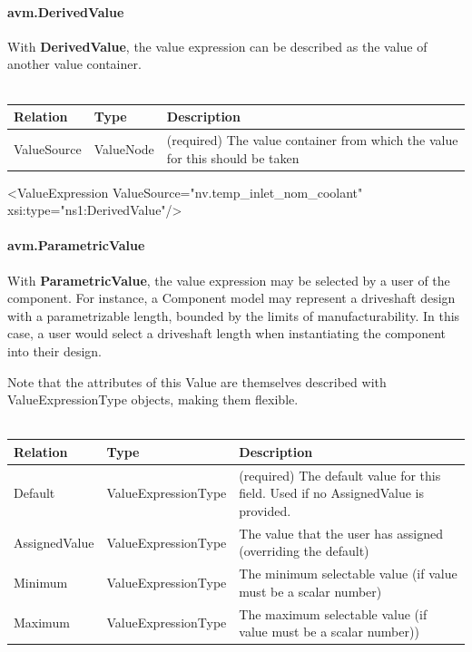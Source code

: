\paragraph{avm.DerivedValue}
With \textbf{DerivedValue}, the value expression can be described as the value of another value container.
\\ \\
\begin{tabular}{ l l p{12.5cm} }
\textbf{Relation} & \textbf{Type} & \textbf{Description} \\ \hline
ValueSource & ValueNode & (required) The value container from which the value for this should be taken \\ \hline
\end{tabular}

\begin{MyVerbatim}[frame=single]
  <ValueExpression 
    ValueSource="nv.temp_inlet_nom_coolant" 
    xsi:type="ns1:DerivedValue"/>
\end{MyVerbatim}

\paragraph{avm.ParametricValue}
With \textbf{ParametricValue}, the value expression may be selected by a user of the component. For instance, a Component model may represent a driveshaft design with a parametrizable length, bounded by the limits of manufacturability. In this case, a user would select a driveshaft length when instantiating the component into their design.

Note that the attributes of this Value are themselves described with ValueExpressionType objects, making them flexible.
\\ \\
\begin{tabular}{ l l p{10cm} }
\textbf{Relation} & \textbf{Type} & \textbf{Description} \\ \hline
Default & ValueExpressionType & (required) The default value for this field. Used if no AssignedValue is provided. \\ \hline
AssignedValue & ValueExpressionType & The value that the user has assigned (overriding the default) \\ \hline
Minimum & ValueExpressionType & The minimum selectable value (if value must be a scalar number) \\ \hline
Maximum & ValueExpressionType & The maximum selectable value (if value must be a scalar number)) \\ \hline
\end{tabular}

